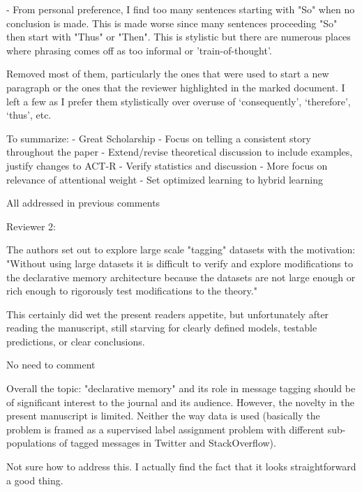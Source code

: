 \documentclass[answers,12pt]{exam}
\begin{document}
\begin{questions}
\question - From personal preference, I find too many sentences starting with "So" when no conclusion is made. This is made worse since many sentences proceeding "So" then start with "Thus" or "Then". This is stylistic but there are numerous places where phrasing comes off as too informal or 'train-of-thought'. 

\begin{solution}
Removed most of them, particularly the ones that were used to start a new paragraph or the ones that the reviewer highlighted in the marked document. I left a few as I prefer them stylistically over overuse of ‘consequently’, ‘therefore’, ‘thus’, etc.
\end{solution}

\question To summarize:
- Great Scholarship
- Focus on telling a consistent story throughout the paper
- Extend/revise theoretical discussion to include examples, justify changes to ACT-R
- Verify statistics and discussion
- More focus on relevance of attentional weight
- Set optimized learning to hybrid learning

\begin{solution}
All addressed in previous comments
\end{solution}


Reviewer 2: 

\question The authors set out to explore large scale "tagging" datasets with the motivation: "Without using large datasets it is difficult to verify and explore modifications to the declarative memory architecture because the datasets are not large enough or rich enough to rigorously test modifications to the theory."

This certainly did wet the present readers appetite, but unfortunately after reading the manuscript, still starving for clearly defined models, testable predictions, or clear conclusions. 

\begin{solution}
No need to comment
\end{solution}

\question Overall the topic: "declarative memory" and its role in message tagging should be of significant interest to the journal and its audience. However, the novelty in the present manuscript is limited. Neither the way data is used (basically the problem is framed as a supervised label assignment problem with different sub-populations of tagged messages in Twitter and StackOverflow). 

\begin{solution}
Not sure how to address this. I actually find the fact that it looks straightforward a good thing.
\end{solution}


\end{questions}
\end{document}
